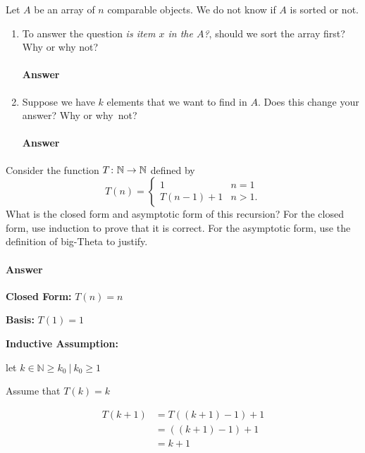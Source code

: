 \documentclass{article}
\begin{document}
\collab{\todo{}}
Let $A$ be an array of $n$ comparable objects.  We do not know if $A$ is sorted
or not.

\begin{enumerate}
	\item To answer the question \emph{is item $x$ in the $A$?}, should we
	      sort the array first?  Why or why not?

	      \paragraph{Answer}
	      \todo{}

	\item Suppose we have $k$ elements that we want to find in $A$. Does this
	      change your answer? Why or why~not?

	      \paragraph{Answer}
	      \todo{}

\end{enumerate}

\collab{\todo{}}
Consider the function $T \colon {\mathbb N} \to {\mathbb N}$ defined by
\[T (n) = \begin{cases}
		1        & n=1  \\
		T(n-1)+1 & n>1.
	\end{cases}
\]
What is the closed form and asymptotic form of this recursion?  For the
closed form, use induction to prove that it is correct.  For the asymptotic
form, use the definition of big-Theta to justify.

\paragraph{Answer}

{\bf Closed Form:} $T (n) = n$

{\bf Basis:} $T (1) = 1$

{\bf Inductive Assumption:}

let $k \in \mathbb{N} \geq k_{0}\ |\ k_{0} \geq 1$

Assume that $T (k) = k$

\begin{align*}
    T (k + 1) &= T((k+1)-1) +1\\
    &= ((k+1) -1 ) +1\\
    &= k + 1
\end{align*}
\end{document}
